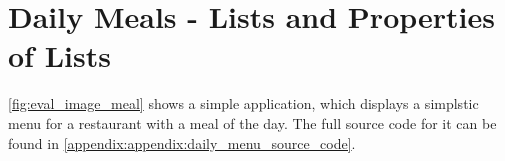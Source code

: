 




\section{Daily Meals - Lists and Properties of Lists}

\ref{fig:eval_image_meal} shows a simple application, which displays a simplstic menu for a restaurant with a meal of the day. The full source code for it can be found in \ref{appendix:appendix:daily_menu_source_code}.

